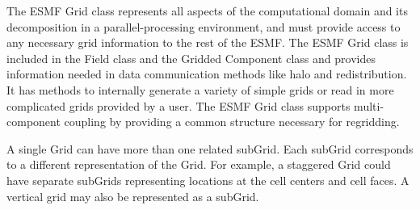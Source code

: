%


The ESMF Grid class represents all aspects of the computational domain and its
decomposition in a parallel-processing environment, and must provide access to
any necessary grid information to the rest of the ESMF.  The ESMF Grid class
is included in the Field class and the Gridded Component class
and provides information needed in data communication methods like halo and
redistribution.  It has methods to internally generate a variety of
simple grids or read in more complicated grids provided by a user.  The
ESMF Grid class supports multi-component coupling by providing a common
structure necessary for regridding.

A single Grid can have more than one related subGrid.  Each subGrid corresponds
to a different representation of the Grid.  For example, a staggered Grid could
have separate subGrids representing locations at the cell centers and cell 
faces.  A vertical grid may also be represented as a subGrid.


